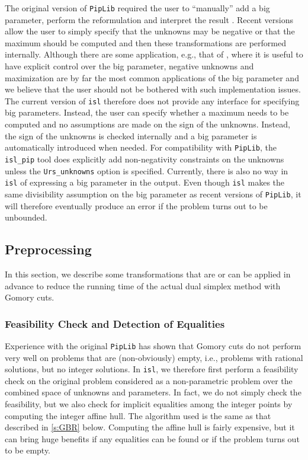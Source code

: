 The original version of {\tt PipLib} required the user to ``manually''
add a big parameter, perform the reformulation and interpret the result
\parencite{Feautrier02}.  Recent versions allow the user to simply
specify that the unknowns may be negative or that the maximum should
be computed and then these transformations are performed internally.
Although there are some application, e.g.,
that of \textcite{Feautrier92multi},
where it is useful to have explicit control over the big parameter,
negative unknowns and maximization are by far the most common applications
of the big parameter and we believe that the user should not be bothered
with such implementation issues.
The current version of {\tt isl} therefore does not
provide any interface for specifying big parameters.  Instead, the user
can specify whether a maximum needs to be computed and no assumptions
are made on the sign of the unknowns.  Instead, the sign of the unknowns
is checked internally and a big parameter is automatically introduced when
needed.  For compatibility with {\tt PipLib}, the {\tt isl\_pip} tool
does explicitly add non-negativity constraints on the unknowns unless
the \verb+Urs_unknowns+ option is specified.
Currently, there is also no way in {\tt isl} of expressing a big
parameter in the output.  Even though
{\tt isl} makes the same divisibility assumption on the big parameter
as recent versions of {\tt PipLib}, it will therefore eventually
produce an error if the problem turns out to be unbounded.

\subsection{Preprocessing}

In this section, we describe some transformations that are
or can be applied in advance to reduce the running time
of the actual dual simplex method with Gomory cuts.

\subsubsection{Feasibility Check and Detection of Equalities}

Experience with the original {\tt PipLib} has shown that Gomory cuts
do not perform very well on problems that are (non-obviously) empty,
i.e., problems with rational solutions, but no integer solutions.
In {\tt isl}, we therefore first perform a feasibility check on
the original problem considered as a non-parametric problem
over the combined space of unknowns and parameters.
In fact, we do not simply check the feasibility, but we also
check for implicit equalities among the integer points by computing
the integer affine hull.  The algorithm used is the same as that
described in \autoref{s:GBR} below.
Computing the affine hull is fairly expensive, but it can
bring huge benefits if any equalities can be found or if the problem
turns out to be empty.

